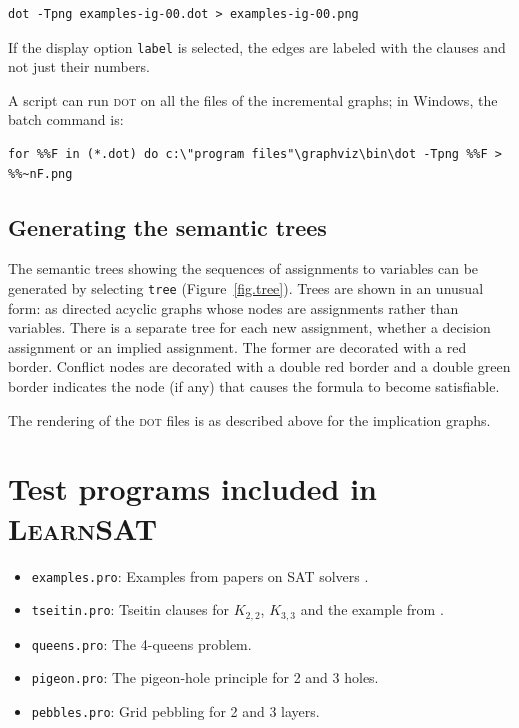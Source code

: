 \documentclass[11pt]{report}
\newcommand*{\p}[1]{\textup{\texttt{#1}}}
\newcommand*{\ls}{\textsc{LearnSAT}}
\newcommand*{\dt}{\textsc{dot}}
\begin{document}
\begin{verbatim}
dot -Tpng examples-ig-00.dot > examples-ig-00.png
\end{verbatim}

If the display option \p{label} is selected, the edges are labeled with
the clauses and not just their numbers.

A script can run \dt{} on all the files of the incremental graphs; in
Windows, the batch command is:

\begin{verbatim}
for %%F in (*.dot) do c:\"program files"\graphviz\bin\dot -Tpng %%F > %%~nF.png
\end{verbatim}


\subsection{Generating the semantic trees}

The semantic trees showing the sequences of assignments to variables can
be generated by selecting \p{tree} (Figure~\ref{fig.tree}). Trees are
shown in an unusual form: as directed acyclic graphs whose nodes are
assignments rather than variables. There is a separate tree for each new
assignment, whether a decision assignment or an implied assignment. The
former are decorated with a red border. Conflict nodes are decorated
with a double red border and a double green border indicates the node
(if any) that causes the formula to become satisfiable.


The rendering of the \dt{} files is as described above for the
implication graphs.

\newpage

\section{Test programs included in \ls{}}

\begin{itemize}
\item \p{examples.pro}: Examples from papers on SAT
solvers \cite{mz,mlm,ms}.

\item \p{tseitin.pro}: Tseitin clauses for $K_{2,2}$,
$K_{3,3}$ and the example from \cite[Section 4.5]{mlcs}.

\item \p{queens.pro}: The 4-queens problem.

\item \p{pigeon.pro}: The pigeon-hole principle for 2 and 3 holes.

\item \p{pebbles.pro}: Grid pebbling for 2 and 3 layers.
\end{itemize}
\end{document}
